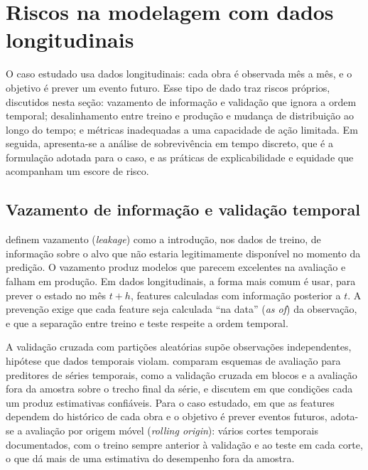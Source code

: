 \section{Riscos na modelagem com dados longitudinais}
\label{sec:riscos}

O caso estudado usa dados longitudinais: cada obra é observada mês a mês, e o objetivo é prever um evento futuro. Esse tipo de dado traz riscos próprios, discutidos nesta seção: vazamento de informação e validação que ignora a ordem temporal; desalinhamento entre treino e produção e mudança de distribuição ao longo do tempo; e métricas inadequadas a uma capacidade de ação limitada. Em seguida, apresenta-se a análise de sobrevivência em tempo discreto, que é a formulação adotada para o caso, e as práticas de explicabilidade e equidade que acompanham um escore de risco.

\subsection{Vazamento de informação e validação temporal}

 definem vazamento (\textit{leakage}) como a introdução, nos dados de treino, de informação sobre o alvo que não estaria legitimamente disponível no momento da predição. O vazamento produz modelos que parecem excelentes na avaliação e falham em produção. Em dados longitudinais, a forma mais comum é usar, para prever o estado no mês $t+h$, features calculadas com informação posterior a $t$. A prevenção exige que cada feature seja calculada ``na data'' (\textit{as of}) da observação, e que a separação entre treino e teste respeite a ordem temporal.

A validação cruzada com partições aleatórias supõe observações independentes, hipótese que dados temporais violam.  comparam esquemas de avaliação para preditores de séries temporais, como a validação cruzada em blocos e a avaliação fora da amostra sobre o trecho final da série, e discutem em que condições cada um produz estimativas confiáveis. Para o caso estudado, em que as features dependem do histórico de cada obra e o objetivo é prever eventos futuros, adota-se a avaliação por origem móvel (\textit{rolling origin}): vários cortes temporais documentados, com o treino sempre anterior à validação e ao teste em cada corte, o que dá mais de uma estimativa do desempenho fora da amostra.

